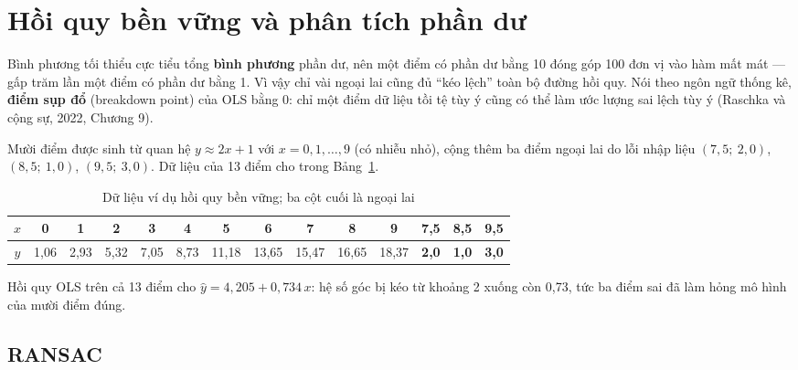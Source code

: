 \section{Hồi quy bền vững và phân tích phần dư}
\label{sec:robust-regression}

Bình phương tối thiểu cực tiểu tổng \textbf{bình phương} phần dư, nên một điểm có phần dư bằng 10 đóng góp 100 đơn vị vào hàm mất mát --- gấp trăm lần một điểm có phần dư bằng 1. Vì vậy chỉ vài ngoại lai cũng đủ ``kéo lệch'' toàn bộ đường hồi quy. Nói theo ngôn ngữ thống kê, \textbf{điểm sụp đổ} (breakdown point) của OLS bằng 0: chỉ một điểm dữ liệu tồi tệ tùy ý cũng có thể làm ước lượng sai lệch tùy ý (Raschka và cộng sự, 2022, Chương 9).

\begin{example}
Mười điểm được sinh từ quan hệ $y \approx 2x + 1$ với $x = 0, 1, \dots, 9$ (có nhiễu nhỏ), cộng thêm ba điểm ngoại lai do lỗi nhập liệu $(7{,}5;\ 2{,}0)$, $(8{,}5;\ 1{,}0)$, $(9{,}5;\ 3{,}0)$. Dữ liệu của 13 điểm cho trong Bảng~\ref{tab:ransac-data}.
\end{example}

\begin{table}[H]
\centering
\small
\begin{tabular}{|c|ccccccccccccc|}
\hline
$x$ & 0 & 1 & 2 & 3 & 4 & 5 & 6 & 7 & 8 & 9 & 7,5 & 8,5 & 9,5 \\ \hline
$y$ & 1,06 & 2,93 & 5,32 & 7,05 & 8,73 & 11,18 & 13,65 & 15,47 & 16,65 & 18,37 & \textbf{2,0} & \textbf{1,0} & \textbf{3,0} \\ \hline
\end{tabular}
\caption{Dữ liệu ví dụ hồi quy bền vững; ba cột cuối là ngoại lai}
\label{tab:ransac-data}
\end{table}

Hồi quy OLS trên cả 13 điểm cho $\hat{y} = 4{,}205 + 0{,}734\,x$: hệ số góc bị kéo từ khoảng 2 xuống còn 0,73, tức ba điểm sai đã làm hỏng mô hình của mười điểm đúng.

\subsection{RANSAC}

